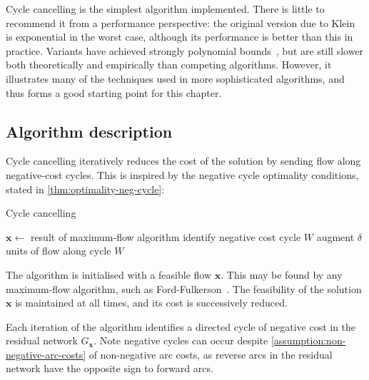 
Cycle cancelling is the simplest algorithm implemented. There is little to recommend it from a performance perspective: the original version due to Klein~\cite{Klein:1967} is exponential in the worst case, although its performance is better than this in practice. Variants have achieved strongly polynomial bounds~\cite{Goldberg:1989,Sokkalingam:2000}, but are still slower both theoretically and empirically than competing algorithms. However, it illustrates many of the techniques used in more sophisticated algorithms, and thus forms a good starting point for this chapter.

\subsection{Algorithm description}

Cycle cancelling iteratively reduces the cost of the solution by sending flow along negative-cost cycles. This is inspired by the negative cycle optimality conditions, stated in \cref{thm:optimality-neg-cycle}:\\

\optimalitynegcycle*

\begin{algorithm}
    \caption{Cycle cancelling}
    \label{algo:cycle-cancelling}
    \begin{algorithmic}[1]
        \State $\mathbf{x}\gets $ result of maximum-flow algorithm 
        \State identify negative cost cycle $W$ 
        \State augment $\delta$ units of flow along cycle $W$
        \EndWhile{}
    \end{algorithmic}
\end{algorithm}

The algorithm is initialised with a feasible flow $\mathbf{x}$. This may be found by any maximum-flow algorithm, such as Ford-Fulkerson~\cite{FordFulkerson:1956}. The feasibility of the solution $\mathbf{x}$ is maintained at all times, and its cost is successively reduced. 

Each iteration of the algorithm identifies a directed cycle of negative cost in the residual network $G_\mathbf{x}$. Note negative cycles can occur despite \cref{assumption:non-negative-arc-costs} of non-negative arc costs, as reverse arcs in the residual network have the opposite sign to forward arcs.

